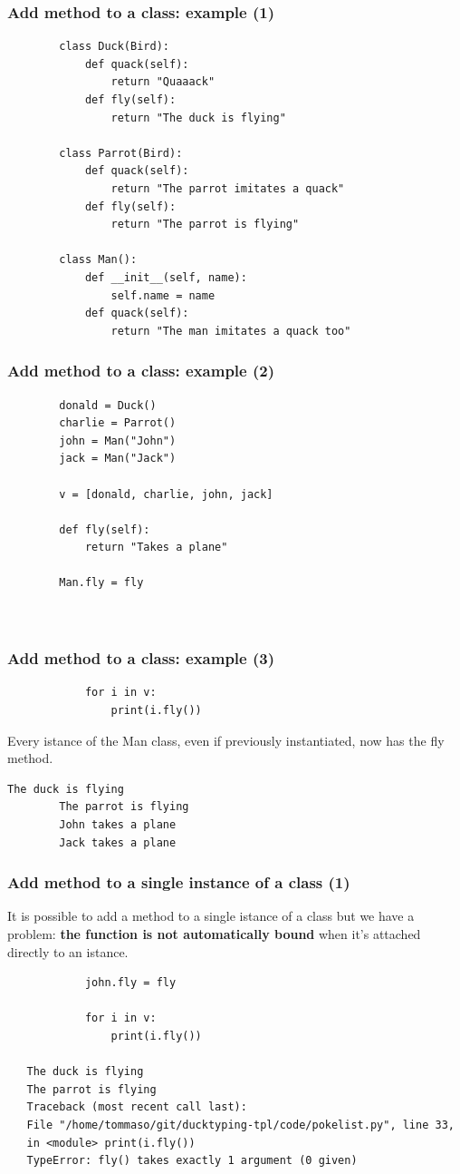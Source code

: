 \documentclass[xcolor ={table,usenames,dvipsnames}]{beamer}
\theoremstyle{definition}
\begin{document}
	\begin{frame}[fragile]
		\frametitle{Add method to a class: example (1)}
		\begin{lstlisting}	
		class Duck(Bird):
			def quack(self):
				return "Quaaack"
			def fly(self):
				return "The duck is flying"
		
		class Parrot(Bird):
			def quack(self):
				return "The parrot imitates a quack"
			def fly(self):
				return "The parrot is flying"
				
		class Man():
			def __init__(self, name):
				self.name = name
			def quack(self):
				return "The man imitates a quack too"
		\end{lstlisting}
		
	\end{frame}
	
	\begin{frame}[fragile]
		\frametitle{Add method to a class: example (2)}
		\begin{lstlisting}
		donald = Duck()
		charlie = Parrot()
		john = Man("John")
		jack = Man("Jack")
		
		v = [donald, charlie, john, jack]
		
		def fly(self):
			return "Takes a plane"
		
		Man.fly = fly
		
		
		\end{lstlisting}
	\end{frame}

	\begin{frame}[fragile]
		\frametitle{Add method to a class: example (3)}
		\begin{lstlisting}
			for i in v:
				print(i.fly())
		\end{lstlisting}
		Every istance of the Man class, even if previously instantiated, now has the fly method.
		\begin{lstlisting}[keywordstyle=\color{black},
		commentstyle=\color{black},
		stringstyle=\color{black}.]	
		The duck is flying
		The parrot is flying
		John takes a plane
		Jack takes a plane
		\end{lstlisting}
	\end{frame}

	\begin{frame}[fragile]
		\frametitle{Add method to a single instance of a class (1)}
			It is possible to add a method to a single istance of a class but we have a problem: \textbf{the function is not automatically bound} when it's attached directly to an istance.
			
				\begin{lstlisting}
			john.fly = fly
			
			for i in v:
				print(i.fly())
				
   The duck is flying
   The parrot is flying
   Traceback (most recent call last):
   File "/home/tommaso/git/ducktyping-tpl/code/pokelist.py", line 33, 
   in <module> print(i.fly())
   TypeError: fly() takes exactly 1 argument (0 given)
			\end{lstlisting}
	\end{frame}
	
\end{document}
